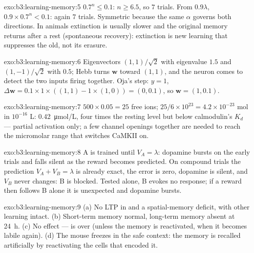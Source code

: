 \begin{solution}{exo:b3:learning-memory:5}
$0.7^{n} \le 0.1$: $n \ge 6.5$, so $7$ trials. From $0.9\lambda$,
$0.9\times 0.7^{n} < 0.1$: again $7$ trials. Symmetric because the same
$\alpha$ governs both directions. In animals extinction is usually
slower and the original memory returns after a rest (spontaneous
recovery): extinction is new learning that suppresses the old, not its
erasure.
\end{solution}

\begin{solution}{exo:b3:learning-memory:6}
Eigenvectors $(1,1)/\sqrt{2}$ with eigenvalue $1.5$ and $(1,-1)/\sqrt{2}$
with $0.5$; Hebb turns $\mathbf{w}$ toward $(1,1)$, and the neuron comes
to detect the two inputs firing together. Oja's step: $y = 1$,
$\Delta\mathbf{w} = 0.1\times 1\times((1,1) - 1\times(1,0)) = (0,0.1)$,
so $\mathbf{w} = (1, 0.1)$.
\end{solution}

\begin{solution}{exo:b3:learning-memory:7}
$500\times 0.05 = 25$ free ions; $25/6\times 10^{23} = 4.2\times 10^{-23}$
mol in $10^{-16}$ L: \qty{0.42}{\micro mol/L}, four times the resting
level but below calmodulin's $K_{d}$ --- partial activation only; a
few channel openings together are needed to reach the micromolar range
that switches CaMKII on.
\end{solution}

\begin{solution}{exo:b3:learning-memory:8}
A is trained until $V_{A} = \lambda$: dopamine bursts on the early
trials and falls silent as the reward becomes predicted. On compound
trials the prediction $V_{A} + V_{B} = \lambda$ is already exact, the
error is zero, dopamine is silent, and $V_{B}$ never changes: B is
blocked. Tested alone, B evokes no response; if a reward then follows B
alone it is unexpected and dopamine bursts.
\end{solution}

\begin{solution}{exo:b3:learning-memory:9}
(a) No LTP in  and a spatial-memory deficit, with other learning
intact. (b) Short-term memory normal, long-term memory absent at
\qty{24}{h}. (c) No effect ---  is over (unless the memory
is reactivated, when it becomes labile again). (d) The mouse freezes in
the safe context: the memory is recalled artificially by reactivating
the cells that encoded it.
\end{solution}

